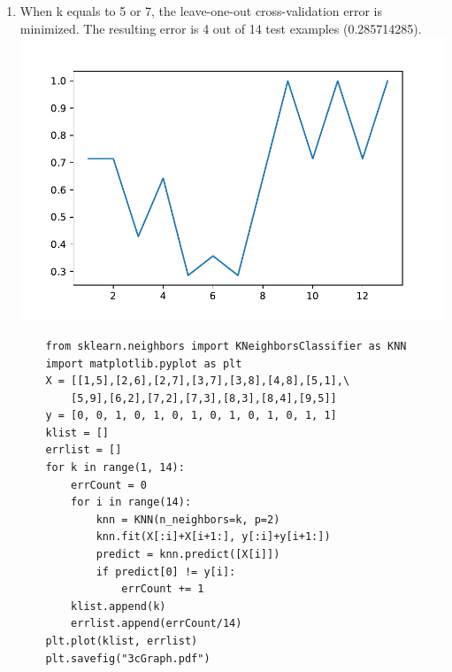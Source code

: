 \documentclass[11pt]{article}
\begin{document}
\begin{enumerate}[label=(\alph*)]
    \item
        When k equals to 5 or 7, the leave-one-out cross-validation error is minimized. The resulting error is 4 out of 14 test examples (0.285714285).\\
    \includegraphics{3cGraph.pdf}
    \begin{verbatim}
    from sklearn.neighbors import KNeighborsClassifier as KNN
    import matplotlib.pyplot as plt
    X = [[1,5],[2,6],[2,7],[3,7],[3,8],[4,8],[5,1],\
        [5,9],[6,2],[7,2],[7,3],[8,3],[8,4],[9,5]]
    y = [0, 0, 1, 0, 1, 0, 1, 0, 1, 0, 1, 0, 1, 1]
    klist = []
    errlist = []
    for k in range(1, 14):
        errCount = 0
        for i in range(14):
            knn = KNN(n_neighbors=k, p=2)
            knn.fit(X[:i]+X[i+1:], y[:i]+y[i+1:])
            predict = knn.predict([X[i]])
            if predict[0] != y[i]:
                errCount += 1
        klist.append(k)
        errlist.append(errCount/14)
    plt.plot(klist, errlist)
    plt.savefig("3cGraph.pdf")
    \end{verbatim}
\end{enumerate}
\end{document}
